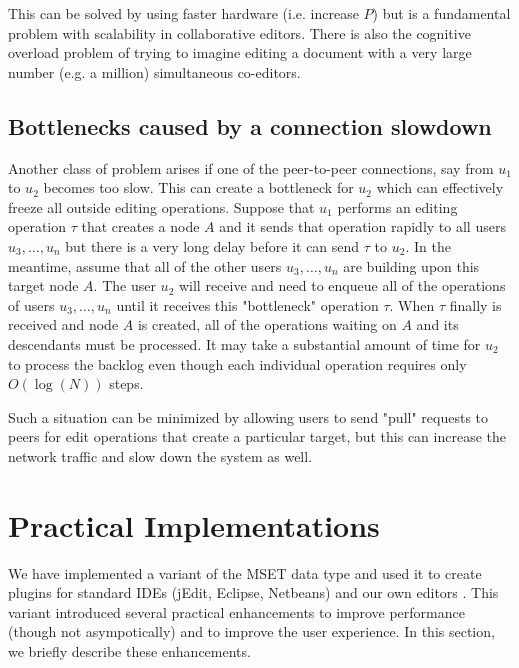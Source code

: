 \documentclass{amsart}
\begin{document}
This can be solved by using faster hardware (i.e. increase $P$) but is a fundamental
problem with scalability in collaborative editors.  There is also the cognitive overload problem of trying to imagine editing a document with a very large
number (e.g. a million) simultaneous co-editors.   

\subsection{Bottlenecks caused by a connection slowdown}
Another class of problem arises if one of the peer-to-peer connections, say from $u_1$ to $u_2$ becomes too slow. This can create a bottleneck for $u_2$ which
can effectively freeze all outside editing operations. 
Suppose that $u_1$ performs 
an editing operation $\tau$ that creates a node $A$ and it sends that operation rapidly to
all users $u_3,\ldots,u_n$ but there is a very long delay before it can send $\tau$ to $u_2$.  In the meantime, assume that
all of the other users $u_3,\ldots,u_n$ are building upon
this target node $A$. The user $u_2$ will receive and need to enqueue all of the operations of users $u_3,\ldots, u_n$ until it receives this "bottleneck" operation $\tau$. When $\tau$ finally is
received and node $A$ is created, all of the operations waiting on $A$ and its descendants must be processed.  It may take a substantial amount of time for $u_2$ to process the backlog
even though each individual operation requires only $O(\log(N))$ steps.  

Such a situation can be minimized by allowing users to send "pull" requests to peers for edit operations that create a particular target, but this can increase the network traffic and slow down the system as well.


\section{Practical Implementations}
\label{sec:implementation}
We have implemented a variant of the MSET data type and used it to create plugins for standard IDEs (jEdit, Eclipse, Netbeans) and our own editors \cite{granville_collabed:_2009}.  This variant introduced several
practical enhancements to improve performance (though not asympotically)
and to improve the user experience.  In this section, we briefly describe these
enhancements.
\end{document}
